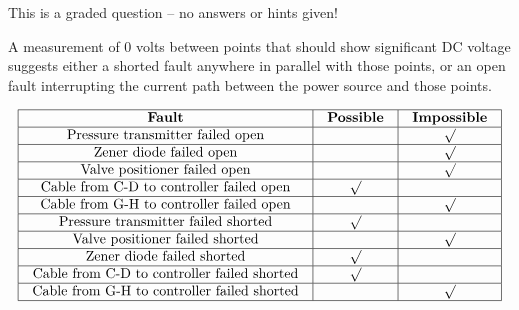 \vfil

\eject






This is a graded question -- no answers or hints given!







A measurement of 0 volts between points that should show significant DC voltage suggests either a shorted fault anywhere in parallel with those points, or an open fault interrupting the current path between the power source and those points.


$$\vbox{\offinterlineskip
\halign{\strut
\vrule \quad\hfil # \ \hfil & 
\vrule \quad\hfil # \ \hfil & 
\vrule \quad\hfil # \ \hfil \vrule \cr
\noalign{\hrule}
%
{\bf Fault} & {\bf Possible} & {\bf Impossible} \cr
%
\noalign{\hrule}
%
Pressure transmitter failed open &  & $\surd$ \cr
%
\noalign{\hrule}
%
Zener diode failed open &  & $\surd$ \cr
%
\noalign{\hrule}
%
Valve positioner failed open &  & $\surd$ \cr
%
\noalign{\hrule}
%
Cable from C-D to controller failed open & $\surd$ &  \cr
%
\noalign{\hrule}
%
Cable from G-H to controller failed open &  & $\surd$ \cr
%
\noalign{\hrule}
%
Pressure transmitter failed shorted & $\surd$ &  \cr
%
\noalign{\hrule}
%
Valve positioner failed shorted &  & $\surd$ \cr
%
\noalign{\hrule}
%
Zener diode failed shorted & $\surd$ &  \cr
%
\noalign{\hrule}
%
Cable from C-D to controller failed shorted & $\surd$ &  \cr
%
\noalign{\hrule}
%
Cable from G-H to controller failed shorted &  & $\surd$ \cr
%
\noalign{\hrule}
} %
}$$ %





